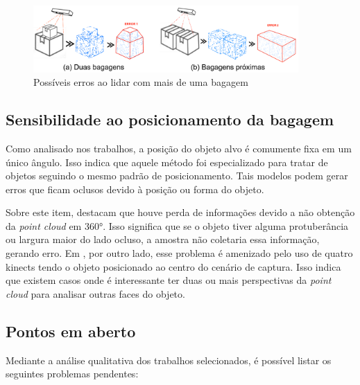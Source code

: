         \begin{figure}[h]
           \centering
           \includegraphics[width=0.9\textwidth]{imagens/PossiveisErrosComaisBagagens.png} 
           \caption{Possíveis erros ao lidar com mais de uma bagagem}
           \label{fig:PossiveisErrosComaisBagagens}
        \end{figure}

\subsection{Sensibilidade ao posicionamento da bagagem}
\label{subsec_Sensibilidade ao posicionamento da bagagem}


    Como analisado nos trabalhos, a posição do objeto alvo é comumente fixa em um único ângulo. Isso indica que aquele método foi especializado para tratar de objetos seguindo o mesmo padrão de posicionamento. Tais modelos podem gerar erros que ficam oclusos devido à posição ou forma do objeto. 
    
    Sobre este item,  destacam que houve perda de informações devido a não obtenção da \textit{point cloud} em 360°. Isso significa que se o objeto tiver alguma protuberância ou largura maior do lado ocluso, a amostra não coletaria essa informação, gerando erro. Em , por outro lado, esse problema é amenizado pelo uso de quatro kinects tendo o objeto posicionado ao centro do cenário de captura. Isso indica que existem casos onde é interessante ter duas ou mais perspectivas da \textit{point cloud} para analisar outras faces do objeto.


\subsection{Pontos em aberto}
\label{subsec_Pontos em aberto}

    Mediante a análise qualitativa dos trabalhos selecionados, é possível listar os seguintes problemas pendentes: 
    
